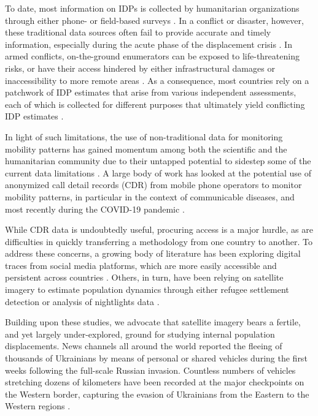 \documentclass[sn-basic]{sn-jnl}%
\begin{document}
To date, most information on IDPs is collected by humanitarian organizations through either phone- or field-based surveys \citep{Baal_et_al_2017, Leasure_et_al_2023}. In a conflict or disaster, however, these traditional data sources often fail to provide accurate and timely information, especially during the acute phase of the displacement crisis \citep{Baal_et_al_2017, Ratnayake_et_al_2022}. In armed conflicts, on-the-ground enumerators can be exposed to life-threatening risks, or have their access hindered by either infrastructural damages or inaccessibility to more remote areas \citep{Abdelmagid_Checchi_2018}. As a consequence, most countries rely on a patchwork of IDP estimates that arise from various independent assessments, each of which is collected for different purposes that ultimately yield conflicting IDP estimates \citep{Baal_et_al_2017}.

In light of such limitations, the use of non-traditional data for monitoring mobility patterns has gained momentum among both the scientific and the humanitarian community due to their untapped potential to sidestep some of the current data limitations \citep{Baal_et_al_2017, Quinn_et_al_2018, Weber_et_al_2021}. 
A large body of work has looked at the potential use of anonymized call detail records (CDR) from mobile phone operators to monitor mobility patterns, in particular in the context of communicable diseases, and most recently during the COVID-19 pandemic \citep{Williams_et_al_2015, Wesolowski_et_al_2012, Wesolowski_et_al_2016, Oliver_et_al_2020}. 

While CDR data is undoubtedly useful, procuring access is a major hurdle, as are difficulties in quickly transferring a methodology from one country to another. 
To address these concerns, a growing body of literature has been exploring digital traces from social media platforms, which are more easily accessible and persistent across countries \citep[e.g.,][]{mazzolietal20plosone, Zagheni_et_al_2014, Palotti_et_al_2020, Rowe_et_al_2022, Leasure_et_al_2023}. Others, in turn, have been relying on satellite imagery to estimate population dynamics through either refugee settlement detection \citep{Quinn_et_al_2018} or analysis of nightlights data \citep{Witmer_et_al_2011, Coscieme_et_al_2017}.

Building upon these studies, we advocate that satellite imagery bears a fertile, and yet largely under-explored, ground for studying internal population displacements. News channels all around the world reported the fleeing of thousands of Ukrainians by means of personal or shared vehicles during the first weeks following the full-scale Russian invasion. Countless numbers of vehicles stretching dozens of kilometers have been recorded at the major checkpoints on the Western border, capturing the evasion of Ukrainians from the Eastern to the Western regions \citep[e.g.,][]{Burnett_et_al_2022, HRW_2022, Vasovic_Zinets_2022}. 
\end{document}
